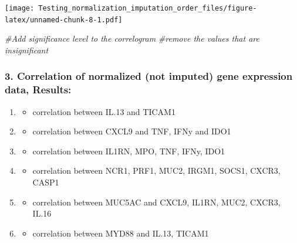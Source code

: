 \documentclass[
]{article}
\newenvironment{Shaded}{\begin{snugshade}}{\end{snugshade}}
\newcommand{\CommentTok}[1]{\textcolor[rgb]{0.56,0.35,0.01}{\textit{#1}}}
\providecommand{\tightlist}{%
  \setlength{\itemsep}{0pt}\setlength{\parskip}{0pt}}
\begin{document}
\texttt{[image: Testing\_normalization\_imputation\_order\_files/figure-latex/unnamed-chunk-8-1.pdf]}

\begin{Shaded}
\begin{Highlighting}[]
  \CommentTok{\#Add significance level to the correlogram}
\CommentTok{\#remove the values that are insignificant}
\end{Highlighting}
\end{Shaded}

\hypertarget{correlation-of-normalized-not-imputed-gene-expression-data-results}{%
\subsubsection{3. Correlation of normalized (not imputed) gene
expression data,
Results:}\label{correlation-of-normalized-not-imputed-gene-expression-data-results}}

\begin{enumerate}
\def\labelenumi{\alph{enumi}.}
\item
  \begin{itemize}
  \tightlist
  \item
    correlation between IL.13 and TICAM1
  \end{itemize}
\item
  \begin{itemize}
  \tightlist
  \item
    correlation between CXCL9 and TNF, IFNy and IDO1
  \end{itemize}
\item
  \begin{itemize}
  \tightlist
  \item
    correlation between IL1RN, MPO, TNF, IFNy, IDO1
  \end{itemize}
\item
  \begin{itemize}
  \tightlist
  \item
    correlation between NCR1, PRF1, MUC2, IRGM1, SOCS1, CXCR3, CASP1
  \end{itemize}
\item
  \begin{itemize}
  \tightlist
  \item
    correlation between MUC5AC and CXCL9, IL1RN, MUC2, CXCR3, IL.16
  \end{itemize}
\item
  \begin{itemize}
  \tightlist
  \item
    correlation between MYD88 and IL.13, TICAM1
  \end{itemize}
\end{enumerate}
\end{document}
